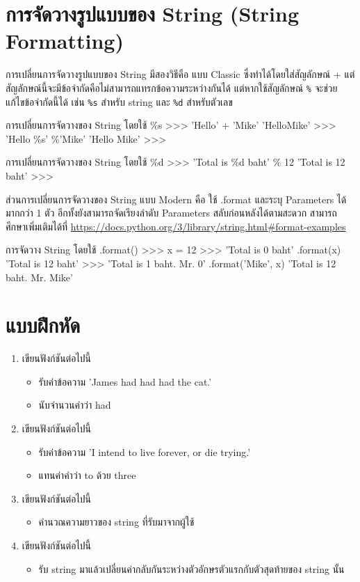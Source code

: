 \section{การจัดวางรูปแบบของ String (String Formatting)}

การเปลี่ยนการจัดวางรูปแบบของ String มีสองวิธีคือ แบบ Classic ซึ่งทำได้โดยใส่สัญลักษณ์ + แต่สัญลักษณ์นี้จะมีข้อจำกัดคือไม่สามารถแทรกข้อความระหว่างกันได้ แต่หากใช้สัญลักษณ์ \texttt{\%} จะช่วยแก้ไขข้อจำกัดนี้ได้ เช่น \texttt{\%s} สำหรับ string และ \texttt{\%d} สำหรับตัวเลข 

\begin{codelist}{การเปลี่ยนการจัดวางของ String โดยใช้ \%s}{}
>>> 'Hello' + 'Mike'
'HelloMike'
>>> 'Hello \%s' \%'Mike'
'Hello Mike'
>>>
\end{codelist}

\begin{codelist}{การเปลี่ยนการจัดวางของ String โดยใช้ \%d}{}
>>> 'Total is \%d baht' \% 12
'Total is 12 baht'
>>>
\end{codelist}



ส่วนการเปลี่ยนการจัดวางของ String แบบ Modern คือ ใช้ .format และระบุ Parameters ได้มากกว่า 1 ตัว อีกทั้งยังสามารถจัดเรียงลำดับ Parameters สลับก่อนหลังได้ตามสะดวก สามารถศึกษาเพิ่มเติมได้ที่ \url{https://docs.python.org/3/library/string.html\#format-examples}

\begin{codelist}{การจัดวาง String โดยใช้ .format()}{}
>>> x = 12
>>> 'Total is {0} baht' .format(x)
'Total is 12 baht'
>>> 'Total is {1} baht. Mr. {0}' .format('Mike', x)
'Total is 12 baht. Mr. Mike'
\end{codelist}


\section{แบบฝึกหัด}
\begin{enumerate} 
\item 	เขียนฟังก์ชันต่อไปนี้
\begin{itemize}
\item 	รับค่าข้อความ 'James had had had the cat.'
\item 	นับจำนวนคำว่า had
\end{itemize}
\item 	เขียนฟังก์ชันต่อไปนี้
\begin{itemize}
\item 	รับค่าข้อความ  'I intend to live forever, or die trying.'
\item 	แทนค่าคำว่า to ด้วย three
\end{itemize}
\item 	เขียนฟังก์ชันต่อไปนี้
\begin{itemize}
\item 	คำนวณความยาวของ string ที่รับมาจากผู้ใช้
\end{itemize}
\item 	เขียนฟังก์ชันต่อไปนี้
\begin{itemize}
\item 	รับ string มาแล้วเปลี่ยนค่ากลับกันระหว่างตัวอักษรตัวแรกกับตัวสุดท้ายของ string นั้น
\end{itemize}
\end{enumerate}


